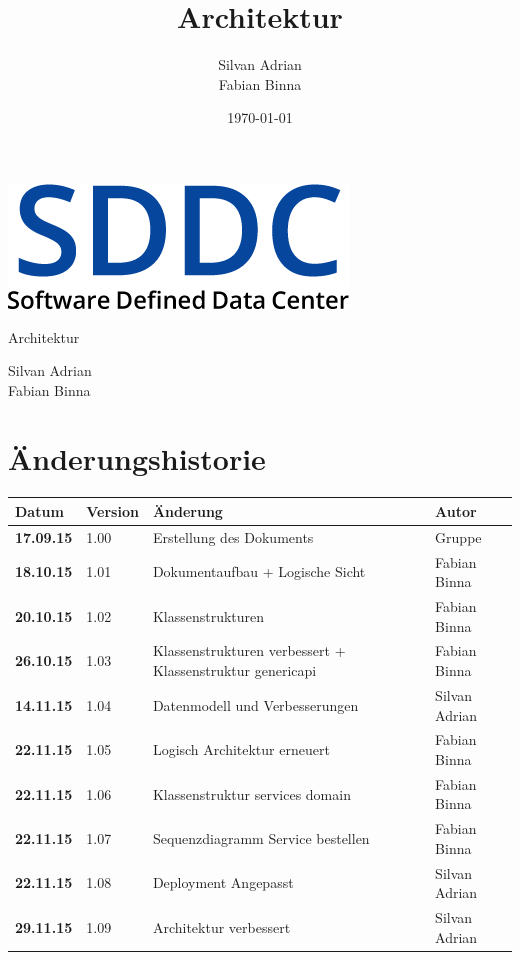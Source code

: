\documentclass[11pt]{scrartcl}
\title{Architektur}
\author{Silvan Adrian \\ Fabian Binna}
\date{\today{}}
\begin{document}
\def\arraystretch{1.5}
\begin{titlepage}
\begin{center}
\vspace{10em}
\includegraphics[scale=2]{SDDC}
\vspace{10em}
\end{center}
\begin{center}
\huge {Architektur}
\end{center}
\begin{center}
\vspace{10em}
\LARGE {Silvan Adrian} \\
\LARGE {Fabian Binna}
\end{center}

\end{titlepage}

\newpage
\section{Änderungshistorie}
\begin{tabularx}{\linewidth}{l l X l}
\textbf{Datum} & \textbf{Version} & \textbf{Änderung}  & \textbf{Autor} \\
\hline
\textbf{17.09.15} & 1.00 & Erstellung des Dokuments & Gruppe \\
\textbf{18.10.15} & 1.01 & Dokumentaufbau + Logische Sicht & Fabian Binna\\
\textbf{20.10.15} & 1.02 & Klassenstrukturen & Fabian Binna\\
\textbf{26.10.15} & 1.03 & Klassenstrukturen verbessert + Klassenstruktur genericapi & Fabian Binna\\
\textbf{14.11.15} & 1.04 & Datenmodell und Verbesserungen & Silvan Adrian\\
\textbf{22.11.15} & 1.05 & Logisch Architektur erneuert & Fabian Binna\\
\textbf{22.11.15} & 1.06 & Klassenstruktur services domain & Fabian Binna\\
\textbf{22.11.15} & 1.07 & Sequenzdiagramm Service bestellen & Fabian Binna\\
\textbf{22.11.15} & 1.08 & Deployment Angepasst & Silvan Adrian\\
\textbf{29.11.15} & 1.09 & Architektur verbessert & Silvan Adrian\\
\end{tabularx}
\end{document}
